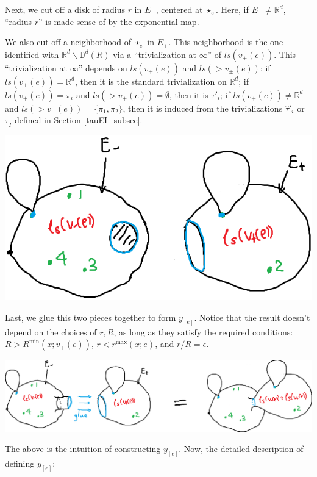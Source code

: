 \documentclass[11pt]{article}
\theoremstyle{definition}
\theoremstyle{remark}
\def\R{\mathbb{R}}
\def\D{\mathbb{D}}
\def\rI{{\mathring{I}}}
\begin{document}
Next, we cut off a disk of radius $r$ in $E_-$, centered at $\star_e$. Here, if $E_-\neq\R^d$, ``radius $r$'' is made sense of by the exponential map. 

We also cut off a neighborhood of $\star_e$ in $E_+$. This neighborhood is the one identified with $\R^d\backslash\D^d(R)$ via a ``trivialization at $\infty$'' of $ls(v_+(e))$. This ``trivialization at $\infty$'' depends on $ls(v_+(e))$ and $ls(>v_\pm(e))$: if $ls(v_+(e))=\R^d$, then it is the standard trivialization on $\R^d$; if $ls(v_+(e))=\pi_i$ and $ls(>v_+(e))=\emptyset$, then it is $\tau'_i$; if $ls(v_+(e))\neq\R^d$ and $ls(>v_-(e))=\{\pi_1,\pi_2\}$, then it is induced from the trivializations $\hat\tau'_i$ or $\tau_\rI$ defined in Section \ref{tauEI_subsec}. 

\includegraphics[scale=0.5]{yedfn2_fig}

Last, we glue this two pieces together to form $y_{[e]}$. Notice that the result doesn't depend on the choices of $r,R$, as long as they satisfy the required conditions:
$R>R^{\min}(x;v_+(e))$, $r<r^{\max}(x;e)$, and $r/R=\epsilon$. 

\includegraphics[scale=0.5]{yedfn3_fig}


The above is the intuition of constructing $y_{[e]}$. Now, the detailed description of defining $y_{[e]}$: 
\end{document}
